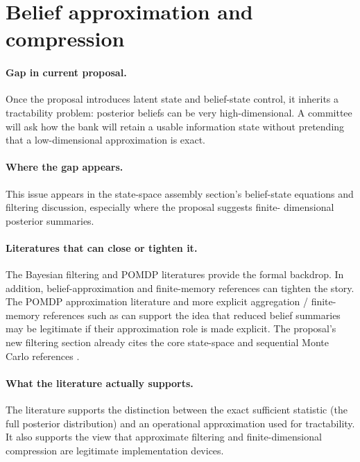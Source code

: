 \documentclass[11pt]{article}
\begin{document}
\section{Belief approximation and compression}

\paragraph{Gap in current proposal.}
Once the proposal introduces latent state and belief-state control, it inherits a
tractability problem: posterior beliefs can be very high-dimensional. A committee
will ask how the bank will retain a usable information state without pretending
that a low-dimensional approximation is exact.

\paragraph{Where the gap appears.}
This issue appears in the state-space assembly section's belief-state equations
and filtering discussion, especially where the proposal suggests finite-
dimensional posterior summaries.

\paragraph{Literatures that can close or tighten it.}
The Bayesian filtering and POMDP literatures provide the formal backdrop. In
addition, belief-approximation and finite-memory references can tighten the
story. The POMDP approximation literature
\citep{smallwood1973pomdp,kaelbling1998pomdp} and more explicit aggregation /
finite-memory references such as \citet{bean1987aggregation} can support the
idea that reduced belief summaries may be legitimate if their approximation role
is made explicit. The proposal's new filtering section already cites the core
state-space and sequential Monte Carlo references
\citep{durbinkoopman2012ssm,westharrison1997bfdm,doucet2001smc}.

\paragraph{What the literature actually supports.}
The literature supports the distinction between the exact sufficient statistic
(the full posterior distribution) and an operational approximation used for
tractability. It also supports the view that approximate filtering and
finite-dimensional compression are legitimate implementation devices.
\end{document}
